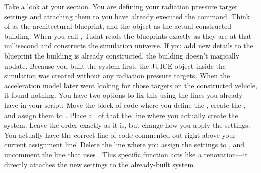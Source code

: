 {}\markdownRendererSectionBegin
{}\markdownRendererInterblockSeparator
{}Take a look at your  section. You are defining your radiation pressure target settings and attaching them to   you have already executed the  command.\markdownRendererInterblockSeparator
{}
\markdownRendererSectionEnd \markdownRendererSectionBegin
{}\markdownRendererInterblockSeparator
{}Think of  as the architectural blueprint, and the  object as the actual constructed building.\markdownRendererInterblockSeparator
{}When you call , Tudat reads the blueprints exactly as they are at that millisecond and constructs the simulation universe. If you add new details to the blueprint  the building is already constructed, the building doesn't magically update.\markdownRendererInterblockSeparator
{}Because you built the system first, the JUICE object inside the simulation was created without any radiation pressure targets. When the acceleration model later went looking for those targets on the constructed vehicle, it found nothing.\markdownRendererInterblockSeparator
{}
\markdownRendererSectionEnd \markdownRendererSectionBegin
{}\markdownRendererInterblockSeparator
{}You have two options to fix this using the lines you already have in your script:\markdownRendererInterblockSeparator
{} Move the block of code where you define the , create the , and assign them to . Place all of that  the line where you actually create the  system.\markdownRendererInterblockSeparator
{} Leave the order exactly as it is, but change how you apply the settings. You actually have the correct line of code commented out right above your current assignment line! Delete the line where you assign the settings to , and uncomment the line that uses . This specific function acts like a renovation—it directly attaches the new settings to the already-built  system.\markdownRendererInterblockSeparator
